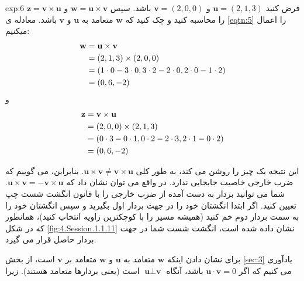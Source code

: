 {\begin{spacing}{1.5}
        \begin{example}{exp:6}
            فرض کنید $\textbf{u}=(2,1,3)$ و $\textbf{v}=(2,0,0)$ باشد. سپس $\textbf{w}=\textbf{u}\times\textbf{v}$ و $\textbf{z}=\textbf{v}\times\textbf{u}$ را محاسبه کنید و چک کنید که $\textbf{w}$ متعامد به $\textbf{u}$ و $\textbf{v}$ باشد. معادله ی \ref{eqtn:5} را اعمال میکنیم: \\
            \begin{equation*}
                \centering
                \begin{split}
                    \textbf{w}&=\textbf{u}\times\textbf{v}\\
                    &=(2,1,3)\times(2,0,0)\\
                    &=(1\cdot 0-3\cdot 0, 3\cdot 2-2\cdot 0, 2\cdot 0-1\cdot 2)\\
                    &=(0,6,-2)
                \end{split}
            \end{equation*}
            و
            \begin{equation*}
                \centering
                \begin{split}
                    \textbf{z}&=\textbf{v}\times\textbf{u}\\
                    &=(2,0,0)\times(2,1,3)\\
                    &=(0\cdot 3-0\cdot 1, 0\cdot 2-2\cdot 3, 2\cdot 1-0\cdot 2)\\
                    &=(0,6,-2)
                \end{split}
            \end{equation*}

            این نتیجه یک چیز را روشن می کند، به طور کلی $\textbf{u}\times\textbf{v}\neq\textbf{v}\times\textbf{u}$. بنابراین، می گوییم که ضرب خارجی خاصیت جابجایی ندارد.
            در واقع می توان نشان داد که $\textbf{u}\times\textbf{v}=-\textbf{v}\times\textbf{u}$. شما می توانید بردار به دست آمده از ضرب خارجی را با قانون انگشت شست چپ تعیین کنید.
            اگر ابتدا انگشتان خود را در جهت بردار اول بگیرید و سپس انگشتان خود را به سمت بردار دوم خم کنید (همیشه مسیر را با کوچکترین زاویه انتخاب کنید)، همانطور که در شکل \ref{fig:4.Session.1.1.11} نشان داده شده است، انگشت شست شما در جهت بردار حاصل قرار می گیرد.

            برای نشان دادن اینکه $\textbf{w}$ متعامد به $\textbf{u}$ و $\textbf{w}$ متعامد بر $\textbf{v}$ است،
            از بخش \ref{sec:3} یادآوری می کنیم که اگر $\textbf{u}\cdot\textbf{v}=0$ باشد،
            آنگاه $\textbf{u}\perp\textbf{v}$ است (یعنی بردارها متعامد هستند). زیرا


\end{example}
\end{spacing}}
